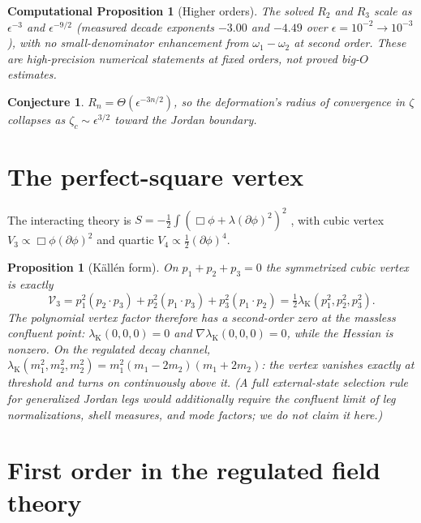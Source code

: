 \documentclass[11pt]{article}
\newtheorem{proposition}[theorem]{Proposition}
\newtheorem{conjecture}[theorem]{Conjecture}
\newtheorem{cproposition}[theorem]{Computational Proposition}
\theoremstyle{definition}
\theoremstyle{remark}
\newcommand{\w}{\omega}
\begin{document}
\begin{cproposition}[Higher orders]\label{cprop:scaling}
The solved $R_2$ and $R_3$ scale as $\epsilon^{-3}$ and
$\epsilon^{-9/2}$ (measured decade exponents $-3.00$ and $-4.49$ over
$\epsilon=10^{-2}\to10^{-3}$), with no small-denominator enhancement
from $\w_1-\w_2$ at second order.  These are high-precision numerical
statements at fixed orders, not proved big-$O$ estimates.
\end{cproposition}

\begin{conjecture}
$R_n=\Theta(\epsilon^{-3n/2})$, so the deformation's radius of
convergence in $\zeta$ collapses as $\zeta_c\sim\epsilon^{3/2}$ toward
the Jordan boundary.
\end{conjecture}

\section{The perfect-square vertex}\label{sec:kallen}

The interacting theory is
$S=-\tfrac12\int(\Box\phi+\lambda(\partial\phi)^2)^2$ \cite{BT2026},
with cubic vertex $V_3\propto\Box\phi(\partial\phi)^2$ and quartic
$V_4\propto\tfrac12(\partial\phi)^4$.

\begin{proposition}[K\"all\'en form]\label{prop:kallen}
On $p_1+p_2+p_3=0$ the symmetrized cubic vertex is exactly
\begin{equation}
\mathcal V_3
=p_1^2(p_2\!\cdot\!p_3)+p_2^2(p_1\!\cdot\!p_3)+p_3^2(p_1\!\cdot\!p_2)
=\tfrac12\lambda_{\mathrm K}(p_1^2,p_2^2,p_3^2).
\end{equation}
The polynomial vertex factor therefore has a \emph{second-order zero at
the massless confluent point}: $\lambda_{\mathrm K}(0,0,0)=0$ and
$\nabla\lambda_{\mathrm K}(0,0,0)=0$, while the Hessian is nonzero.  On
the regulated decay channel,
$\lambda_{\mathrm K}(m_1^2,m_2^2,m_2^2)=m_1^2(m_1-2m_2)(m_1+2m_2)$:
the vertex vanishes exactly at threshold and turns on continuously
above it.  (A full external-state selection rule for generalized Jordan
legs would additionally require the confluent limit of leg
normalizations, shell measures, and mode factors; we do not claim it
here.)
\end{proposition}

\section{First order in the regulated field theory}\label{sec:firstfield}
\end{document}

